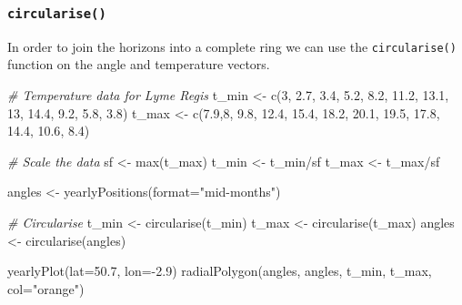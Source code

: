 \documentclass[
]{book}
\newenvironment{Shaded}{\begin{snugshade}}{\end{snugshade}}
\newcommand{\AttributeTok}[1]{\textcolor[rgb]{0.77,0.63,0.00}{#1}}
\newcommand{\CommentTok}[1]{\textcolor[rgb]{0.56,0.35,0.01}{\textit{#1}}}
\newcommand{\DecValTok}[1]{\textcolor[rgb]{0.00,0.00,0.81}{#1}}
\newcommand{\FloatTok}[1]{\textcolor[rgb]{0.00,0.00,0.81}{#1}}
\newcommand{\FunctionTok}[1]{\textcolor[rgb]{0.00,0.00,0.00}{#1}}
\newcommand{\NormalTok}[1]{#1}
\newcommand{\OtherTok}[1]{\textcolor[rgb]{0.56,0.35,0.01}{#1}}
\newcommand{\SpecialCharTok}[1]{\textcolor[rgb]{0.00,0.00,0.00}{#1}}
\newcommand{\StringTok}[1]{\textcolor[rgb]{0.31,0.60,0.02}{#1}}
\begin{document}
\hypertarget{circularise}{%
\subsubsection{\texorpdfstring{\texttt{circularise()}}{circularise()}}\label{circularise}}

In order to join the horizons into a complete ring we can use the \texttt{circularise()} function on the angle and temperature vectors.

\begin{Shaded}
\begin{Highlighting}[]
\CommentTok{\# Temperature data for Lyme Regis}
\NormalTok{t\_min }\OtherTok{\textless{}{-}} \FunctionTok{c}\NormalTok{(}\DecValTok{3}\NormalTok{, }\FloatTok{2.7}\NormalTok{, }\FloatTok{3.4}\NormalTok{, }\FloatTok{5.2}\NormalTok{, }\FloatTok{8.2}\NormalTok{, }\FloatTok{11.2}\NormalTok{, }\FloatTok{13.1}\NormalTok{, }\DecValTok{13}\NormalTok{, }\FloatTok{14.4}\NormalTok{, }\FloatTok{9.2}\NormalTok{, }\FloatTok{5.8}\NormalTok{, }\FloatTok{3.8}\NormalTok{)}
\NormalTok{t\_max }\OtherTok{\textless{}{-}} \FunctionTok{c}\NormalTok{(}\FloatTok{7.9}\NormalTok{,}\DecValTok{8}\NormalTok{, }\FloatTok{9.8}\NormalTok{, }\FloatTok{12.4}\NormalTok{, }\FloatTok{15.4}\NormalTok{, }\FloatTok{18.2}\NormalTok{, }\FloatTok{20.1}\NormalTok{, }\FloatTok{19.5}\NormalTok{, }\FloatTok{17.8}\NormalTok{, }\FloatTok{14.4}\NormalTok{, }\FloatTok{10.6}\NormalTok{, }\FloatTok{8.4}\NormalTok{)}

\CommentTok{\# Scale the data}
\NormalTok{sf }\OtherTok{\textless{}{-}} \FunctionTok{max}\NormalTok{(t\_max)}
\NormalTok{t\_min }\OtherTok{\textless{}{-}}\NormalTok{ t\_min}\SpecialCharTok{/}\NormalTok{sf}
\NormalTok{t\_max }\OtherTok{\textless{}{-}}\NormalTok{ t\_max}\SpecialCharTok{/}\NormalTok{sf}

\NormalTok{angles }\OtherTok{\textless{}{-}} \FunctionTok{yearlyPositions}\NormalTok{(}\AttributeTok{format=}\StringTok{"mid{-}months"}\NormalTok{)}

\CommentTok{\# Circularise}
\NormalTok{t\_min }\OtherTok{\textless{}{-}} \FunctionTok{circularise}\NormalTok{(t\_min)}
\NormalTok{t\_max }\OtherTok{\textless{}{-}} \FunctionTok{circularise}\NormalTok{(t\_max)}
\NormalTok{angles }\OtherTok{\textless{}{-}} \FunctionTok{circularise}\NormalTok{(angles)}

\FunctionTok{yearlyPlot}\NormalTok{(}\AttributeTok{lat=}\FloatTok{50.7}\NormalTok{, }\AttributeTok{lon=}\SpecialCharTok{{-}}\FloatTok{2.9}\NormalTok{)}
\FunctionTok{radialPolygon}\NormalTok{(angles, angles, t\_min, t\_max, }\AttributeTok{col=}\StringTok{"orange"}\NormalTok{)}
\end{Highlighting}
\end{Shaded}
\end{document}
